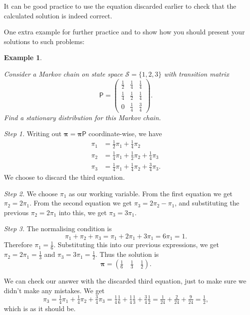 \documentclass[
  a4paper,
]{article}
\theoremstyle{definition}
\theoremstyle{definition}
\newtheorem{example}{Example}[section]
\theoremstyle{definition}
\theoremstyle{remark}
\begin{document}
It can be good practice to use the equation discarded earlier to check that the calculated solution is indeed correct.

One extra example for further practice and to show how you should present your solutions to such problems:

\begin{example}
\protect\hypertarget{exm:stationary-1}{}\label{exm:stationary-1}

\emph{Consider a Markov chain on state space \(\mathcal S = \{1,2,3\}\) with transition matrix}
\[ \mathsf P = \begin{pmatrix} \tfrac12 & \tfrac14& \frac14 \\
                   \tfrac14& \frac12& \frac14 \\
                   0       & \frac14 & \frac34 \end{pmatrix} . \]
\emph{Find a stationary distribution for this Markov chain.}

\emph{Step 1.} Writing out \(\boldsymbol \pi = \boldsymbol \pi\mathsf P\) coordinate-wise, we have
\begin{align*}
\pi_1 &= \tfrac12 \pi_1 + \tfrac14\pi_2 \\
\pi_2 &= \tfrac14\pi_1 + \tfrac12\pi_2 + \tfrac14\pi_3 \\
\pi_3 &= \tfrac14\pi_1 + \tfrac14\pi_2 + \tfrac34\pi_3 .
\end{align*}
We choose to discard the third equation.

\emph{Step 2.} We choose \(\pi_1\) as our working variable. From the first equation we get \(\pi_2 = 2\pi_1\). From the second equation we get \(\pi_3 = 2\pi_2 - \pi_1\), and substituting the previous \(\pi_2 = 2\pi_1\) into this, we get \(\pi_3 = 3\pi_1\).

\emph{Step 3.} The normalising condition is
\[ \pi_1 + \pi_2 + \pi_3 = \pi_1 + 2\pi_1 + 3\pi_1 = 6\pi_1 = 1 . \]
Therefore \(\pi_1 = \frac16\). Substituting this into our previous expressions, we get \(\pi_2 = 2\pi_1 = \frac13\) and \(\pi_3 = 3\pi_1 = \frac12\).
Thus the solution is
\[ \boldsymbol\pi = \left( \tfrac16 \quad \tfrac13 \quad \tfrac12 \right) . \]

We can check our answer with the discarded third equation, just to make sure we didn't make any mistakes. We get
\[ \pi_3 = \tfrac14\pi_1 + \tfrac14\pi_2 + \tfrac34\pi_3 = \tfrac14\tfrac16 + \tfrac14\tfrac13+\tfrac34\tfrac12 = \tfrac1{24} + \tfrac2{24} + \tfrac{9}{24} = \tfrac{1}{2} , \]
which is as it should be.

\end{example}
\end{document}

